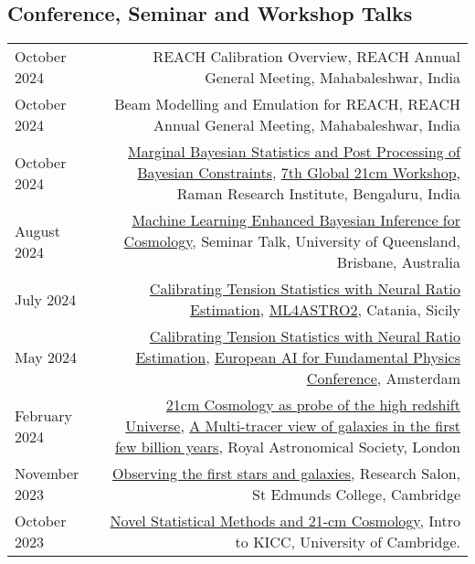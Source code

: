 \documentclass{article}
\begin{document}
\subsection*{Conference, Seminar and Workshop Talks}
\begin{tabular}{L!{\vrule}R}
    October 2024 & {REACH Calibration Overview}, REACH Annual General Meeting, Mahabaleshwar, India \\
    October 2024 & {Beam Modelling and Emulation for REACH}, REACH Annual General Meeting, Mahabaleshwar, India \\
    October 2024 & \href{https://github.com/htjb/Talks/raw/master/Talks/7th-Global-Workshop/margarine.pdf}{Marginal Bayesian Statistics and Post Processing of Bayesian Constraints}, \href{https://sites.google.com/view/global-21-cm-workshop}{7th Global 21cm Workshop}, Raman Research Institute, Bengaluru, India \\
    August 2024 & \href{https://github.com/htjb/Talks/tree/master/Talks/brisbane_davis_group_meeting_2024}{Machine Learning Enhanced Bayesian Inference for Cosmology}, Seminar Talk, University of Queensland, Brisbane, Australia \\
    July 2024 & \href{https://github.com/htjb/Talks/raw/master/Talks/ML4ASTRO-Tensionnets/tensions.pdf}{Calibrating Tension Statistics with Neural Ratio Estimation}, \href{https://indico.ict.inaf.it/event/2690/}{ML4ASTRO2}, Catania, Sicily \\
    May 2024 & \href{https://github.com/htjb/Talks/raw/master/Talks/Amsterdam-EuCAIF-2024/tensions.pdf}{Calibrating Tension Statistics with Neural Ratio Estimation}, \href{https://indico.nikhef.nl/event/4875/}{European AI for Fundamental Physics Conference}, Amsterdam \\
    February 2024 & \href{https://github.com/htjb/Talks/raw/master/Talks/RAS_Multi-tracer_View/21cmCosmo.pdf}{21cm Cosmology as probe of the high redshift Universe}, \href{https://ras.ac.uk/events-and-meetings/ras-meetings/multi-tracer-view-galaxies-first-few-billion-years}{A Multi-tracer view of galaxies in the first few billion years}, Royal Astronomical Society, London \\
    November 2023 & \href{https://github.com/htjb/Talks/raw/master/Talks/St_Edmunds_Research_Salon_Nov_2023/research_salon.pdf}{Observing the first stars and galaxies}, Research Salon, St Edmunds College, Cambridge \\
    October 2023 & \href{https://github.com/htjb/Talks/raw/master/Talks/KICC_Intro_23/kicc_intro_23.pdf}{Novel Statistical Methods and 21-cm Cosmology}, Intro to KICC, University of Cambridge. \\

\end{tabular}
\end{document}
